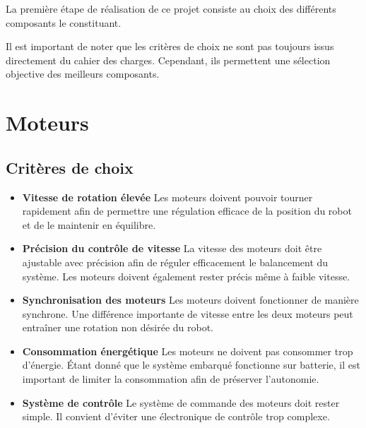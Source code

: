 La première étape de réalisation de ce projet consiste au choix des différents composants le constituant.

Il est important de noter que les critères de choix ne sont pas toujours issus directement du cahier des charges. Cependant, ils permettent une sélection objective des meilleurs composants.

\section{Moteurs}

\subsection{Critères de choix}

\begin{itemize}
    \item \textbf{Vitesse de rotation élevée}  
    Les moteurs doivent pouvoir tourner rapidement afin de permettre une régulation efficace de la position du robot et de le maintenir en équilibre.

    \item \textbf{Précision du contrôle de vitesse}  
    La vitesse des moteurs doit être ajustable avec précision afin de réguler efficacement le balancement du système.  
    Les moteurs doivent également rester précis même à faible vitesse.

    \item \textbf{Synchronisation des moteurs}  
    Les moteurs doivent fonctionner de manière synchrone. Une différence importante de vitesse entre les deux moteurs peut entraîner une rotation non désirée du robot.

    \item \textbf{Consommation énergétique}  
    Les moteurs ne doivent pas consommer trop d’énergie. Étant donné que le système embarqué fonctionne sur batterie, il est important de limiter la consommation afin de préserver l’autonomie.

    \item \textbf{Système de contrôle}  
    Le système de commande des moteurs doit rester simple. Il convient d’éviter une électronique de contrôle trop complexe.
\end{itemize}

